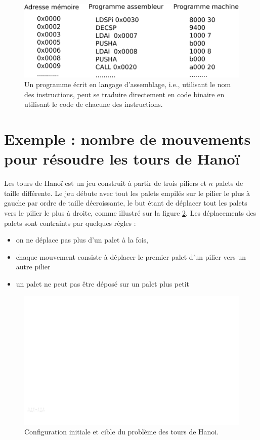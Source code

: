 \begin{figure}[htbp]
\includegraphics[width=0.7\linewidth]{Figs/traduction_asm_machine.pdf}
\caption{\label{fig:traduction_asm_machine} Un programme écrit en langage d'assemblage, i.e., utilisant le nom des instructions, peut se traduire directement en code binaire en utilisant le code de chacune des instructions.}
\end{figure}


\section{Exemple : nombre de mouvements pour résoudre les tours de Hanoï}

Les tours de Hanoï est un jeu construit à partir de trois piliers et $n$ palets de taille différente. Le jeu débute avec tout les palets empilés sur le pilier le plus à gauche par ordre de taille décroissante, le but étant de déplacer tout les palets vers le pilier le plus à droite, comme illustré sur la figure \ref{fig:hanoi}. Les déplacements des palets sont contraints par quelques règles :
\begin{itemize}
\item on ne déplace pas plus d'un palet à la fois,
\item chaque mouvement consiste à déplacer le premier palet d'un pilier vers un autre pilier
\item un palet ne peut pas être déposé sur un palet plus petit
\end{itemize}

\begin{figure}[htbp]
\includegraphics[width=\linewidth]{Figs/hanoi.pdf}
\caption{\label{fig:hanoi} Configuration initiale et cible du problème des tours de Hanoi.}
\end{figure}

